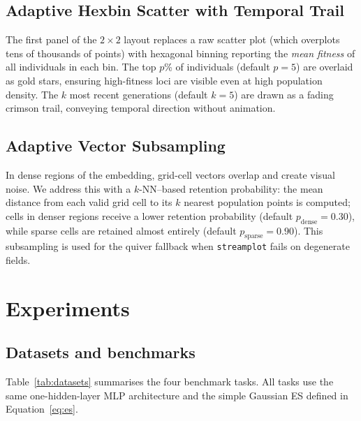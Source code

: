\documentclass{article}
\begin{document}
\subsection{Adaptive Hexbin Scatter with Temporal Trail}

The first panel of the $2\!\times\!2$ layout replaces a raw scatter plot
(which overplots tens of thousands of points) with hexagonal binning reporting
the \emph{mean fitness} of all individuals in each bin.
The top $p$\% of individuals (default $p=5$) are overlaid as gold stars,
ensuring high-fitness loci are visible even at high population density.
The $k$ most recent generations (default $k=5$) are drawn as a fading crimson
trail, conveying temporal direction without animation.

\subsection{Adaptive Vector Subsampling}
\label{sec:subsample}

In dense regions of the embedding, grid-cell vectors overlap and create visual
noise.
We address this with a $k$-NN--based retention probability: the mean distance
from each valid grid cell to its $k$ nearest population points is computed;
cells in denser regions receive a lower retention probability (default
$p_{\text{dense}} = 0.30$), while sparse cells are retained almost entirely
(default $p_{\text{sparse}} = 0.90$).
This subsampling is used for the quiver fallback when \texttt{streamplot}
fails on degenerate fields.


\section{Experiments}
\label{sec:experiments}

\subsection{Datasets and benchmarks}

Table~\ref{tab:datasets} summarises the four benchmark tasks.
All tasks use the same one-hidden-layer MLP architecture and the simple
Gaussian ES defined in Equation~\eqref{eq:es}.
\end{document}
